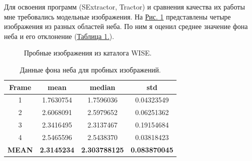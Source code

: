 \documentclass[12pt,a4paper]{article}
\begin{document}
Для освоения программ (SExtractor, Tractor) и сравнения качества их работы мне требовались модельные изображения. 
На \hyperref[pic1]{Рис. 1} представлены четыре изображения из разных областей неба. По ним я оценил среднее значение фона неба и его отклонение (\hyperref[tab1]{Таблица 1.}). 


\begin{figure}
    \begin{minipage}{0.45\linewidth}
    \end{minipage}    
    \hfill
    \begin{minipage}{0.45\linewidth}
    \end{minipage}
    \vfill \label{pic1}
    \begin{minipage}{0.45\linewidth}
    \end{minipage}
    \hfill
    \begin{minipage}{0.45\linewidth}
    \end{minipage}
    \caption{Пробные изображения из каталога WISE.} 
\end{figure}

\begin{table}[h]
\begin{center}
			\begin{tabular}{|c|c|c|c|}
				\hline 
				Frame & mean & median & std \\
				 \hline
				 1 & 1.7630754 & 1.7596036 & 0.04323549 \\
				 \hline 
				 2 & 2.6068091 & 2.5979652 & 0.06251362 \\
				 \hline
				 3 & 2.3416495 & 2.3137467 & 0.19154684 \\
				 \hline
				 4 & 2.5465596 & 2.5438370 & 0.03818423 \\
				 \hline
				 \textbf{MEAN} &  \textbf{2.3145234} &\textbf{2.303788125} & \textbf{0.083870045}\\
				 \hline
			\end{tabular} 
        \caption{Данные фона неба для пробных изображений.} \label{tab1}
\end{center} 		
\end{table} 
\end{document}
